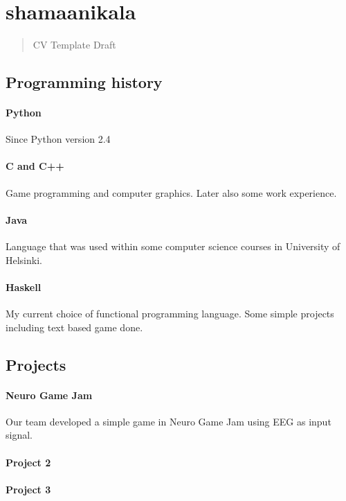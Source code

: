 \documentclass[12pt,a4paper,twocolumn]{report}
\begin{document}
\section*{shamaanikala}
\begin{quote}
CV Template Draft
\end{quote}
\subsection*{Programming history}
\paragraph*{Python}
Since Python version 2.4

\paragraph*{C and C++}
Game programming and computer graphics.
Later also some work experience.

\paragraph*{Java}
Language that was used within some computer science courses in University of Helsinki.

\paragraph*{Haskell}
My current choice of functional programming language.
Some simple projects including text based game done.

\subsection*{Projects}
\paragraph*{Neuro Game Jam}
Our team developed a simple game in Neuro Game Jam using EEG as input signal.

\paragraph*{Project 2}
\lipsum[1-3][5-7]

\paragraph*{Project 3}
\lipsum[1-3][5-7]
\end{document}
